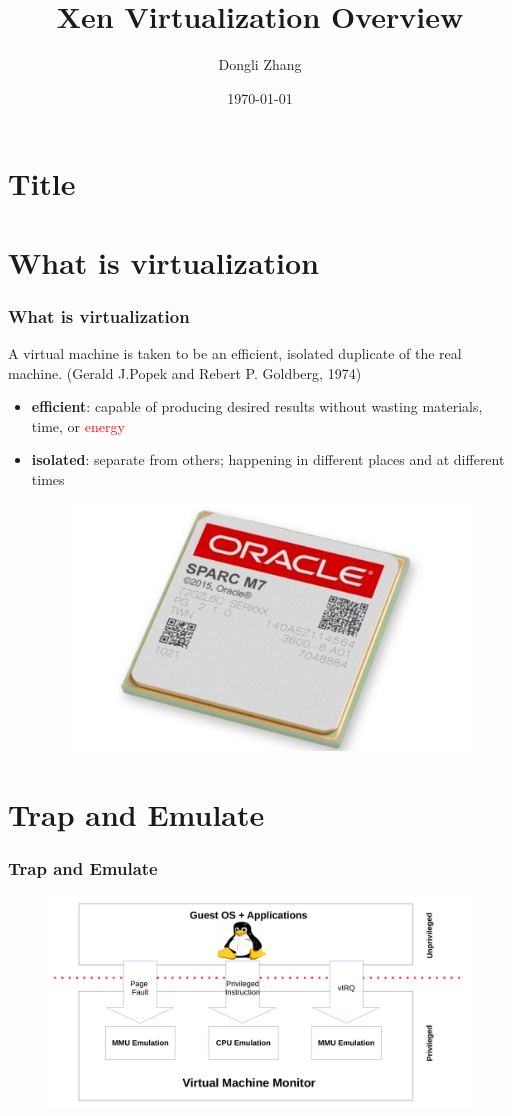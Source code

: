 \documentclass[aspectratio=169]{beamer}
\title[Xen Overview]{Xen Virtualization Overview} %
\author{Dongli Zhang} %
\institute[Oracle] %
{
Oracle Asia Research and Development Centers (Beijing) \\ %
\medskip
\textit{dongli.zhang@oracle.com} %
}
\date{\today} %
\begin{document}

\section{Title}
\begin{frame}
\titlepage %
\end{frame}


\section{What is virtualization}
\begin{frame}
\frametitle{What is virtualization}
A virtual machine is taken to be an efficient, isolated duplicate of the real machine. (Gerald J.Popek and Rebert P. Goldberg, 1974) \pause
\begin{itemize}
\item \textbf{efficient}: capable of producing desired results without wasting materials, time, or \textcolor<3->{red}{energy}\pause \pause
\item \textbf{isolated}: separate from others; happening in different places and at different times
\begin{figure}
\includegraphics[width=0.3\linewidth]{figures/sparc.pdf}
\end{figure}
\end{itemize}
\end{frame}


\section{Trap and Emulate}
\begin{frame}
\frametitle{Trap and Emulate}
\begin{figure}
\includegraphics[width=1.0\linewidth]{figures/trapemu.pdf}
\end{figure}
\end{frame}
\end{document}

